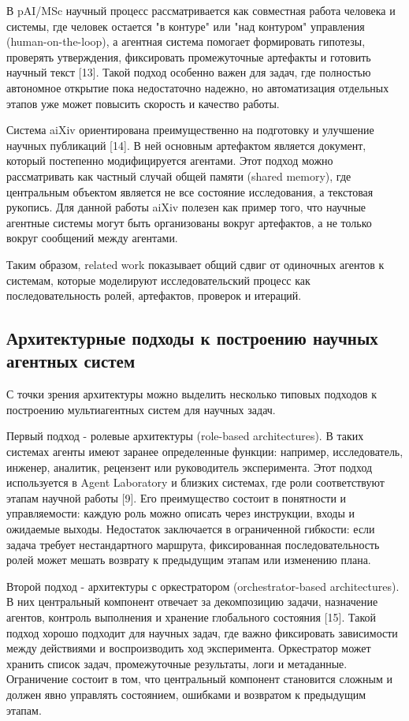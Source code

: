 В pAI/MSc научный процесс рассматривается как совместная работа человека и системы, где человек остается "в контуре" или "над контуром" управления (human-on-the-loop), а агентная система помогает формировать гипотезы, проверять утверждения, фиксировать промежуточные артефакты и готовить научный текст [13]. Такой подход особенно важен для задач, где полностью автономное открытие пока недостаточно надежно, но автоматизация отдельных этапов уже может повысить скорость и качество работы.

Система aiXiv ориентирована преимущественно на подготовку и улучшение научных публикаций [14]. В ней основным артефактом является документ, который постепенно модифицируется агентами. Этот подход можно рассматривать как частный случай общей памяти (shared memory), где центральным объектом является не все состояние исследования, а текстовая рукопись. Для данной работы aiXiv полезен как пример того, что научные агентные системы могут быть организованы вокруг артефактов, а не только вокруг сообщений между агентами.

Таким образом, related work показывает общий сдвиг от одиночных агентов к системам, которые моделируют исследовательский процесс как последовательность ролей, артефактов, проверок и итераций.

\subsection{Архитектурные подходы к построению научных агентных систем}

С точки зрения архитектуры можно выделить несколько типовых подходов к построению мультиагентных систем для научных задач.

Первый подход - ролевые архитектуры (role-based architectures). В таких системах агенты имеют заранее определенные функции: например, исследователь, инженер, аналитик, рецензент или руководитель эксперимента. Этот подход используется в Agent Laboratory и близких системах, где роли соответствуют этапам научной работы [9]. Его преимущество состоит в понятности и управляемости: каждую роль можно описать через инструкции, входы и ожидаемые выходы. Недостаток заключается в ограниченной гибкости: если задача требует нестандартного маршрута, фиксированная последовательность ролей может мешать возврату к предыдущим этапам или изменению плана.

Второй подход - архитектуры с оркестратором (orchestrator-based architectures). В них центральный компонент отвечает за декомпозицию задачи, назначение агентов, контроль выполнения и хранение глобального состояния [15]. Такой подход хорошо подходит для научных задач, где важно фиксировать зависимости между действиями и воспроизводить ход эксперимента. Оркестратор может хранить список задач, промежуточные результаты, логи и метаданные. Ограничение состоит в том, что центральный компонент становится сложным и должен явно управлять состоянием, ошибками и возвратом к предыдущим этапам.

